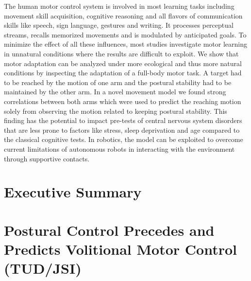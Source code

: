 \documentclass[12pt,a4paper,twoside]{report}
\begin{document}
The human motor control system is involved in most learning tasks including 
movement skill acquisition, cognitive reasoning and all flavors of communication 
skills like speech, sign language, gestures and writing. It processes perceptual 
streams, recalls memorized movements and is modulated by anticipated goals. To 
minimize the effect of all these influences, most studies investigate motor learning 
in unnatural conditions where the results are difficult to exploit. We show that 
motor adaptation can be analyzed under more ecological and thus more natural 
conditions by inspecting  the adaptation of a full-body motor task. A target had 
to be reached by the motion of one arm and the postural stability had to be 
maintained by the other arm. In a novel movement model we found strong  
correlations between both arms which were used to predict the reaching motion 
solely from observing the motion related to keeping postural stability. This 
finding has the potential to impact pre-tests of central nervous system 
disorders that are less prone to factors like stress, sleep deprivation and age 
compared to the classical cognitive tests. In robotics, the model can be 
exploited to overcome current limitations of autonomous robots in interacting 
with the environment through supportive contacts. 

\chapter{Executive Summary}

\chapter{Postural Control Precedes and Predicts Volitional Motor Control (TUD/JSI)}\label{sec:ElmarPrePrint}




\end{document}
